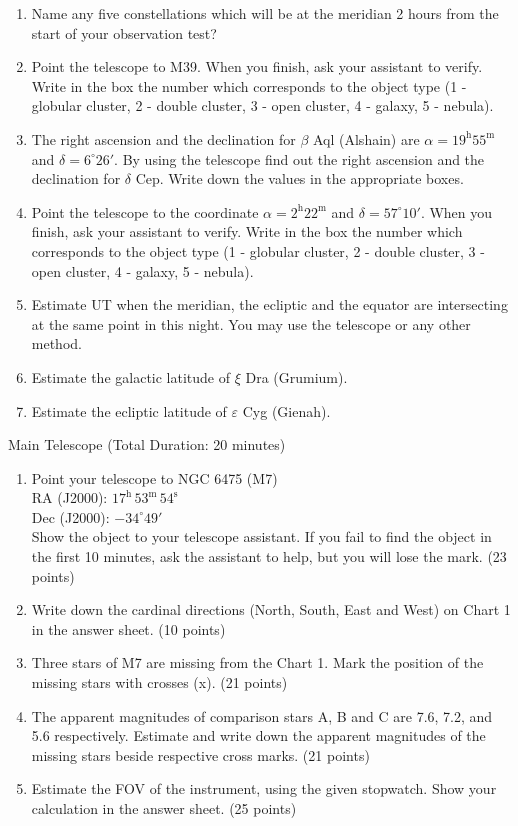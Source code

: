 \begin{enumerate}
\item Name any five constellations which will be at the meridian 2 hours
  from the start of your observation test?
\item Point the telescope to M39. When you finish, ask your assistant to
  verify. Write in the box the number which corresponds to the object type
  (1 - globular cluster, 2 - double cluster, 3 - open cluster, 4 - galaxy,
  5 - nebula).
\item The right ascension and the declination for $\beta$ Aql (Alshain) are
  $\alpha = 19^{\mathrm{h}}55^{\mathrm{m}}$ and $\delta = 6^\circ 26'$. By
  using the telescope find out the right ascension and the declination for
  $\delta$ Cep. Write down the values in the appropriate boxes.
\item Point the telescope to the coordinate
  $\alpha = 2^{\mathrm{h}}22^{\mathrm{m}}$ and $\delta = 57^\circ 10'$. When
  you finish, ask your assistant to verify. Write in the box the number
  which corresponds to the object type (1 - globular cluster, 2 - double
  cluster, 3 - open cluster, 4 - galaxy, 5 - nebula).
\item Estimate UT when the meridian, the ecliptic and the equator are
  intersecting at the same point in this night. You may use the telescope or
  any other method.
\item Estimate the galactic latitude of $\xi$ Dra (Grumium).
\item Estimate the ecliptic latitude of $\varepsilon$ Cyg (Gienah).
\end{enumerate}

Main Telescope (Total Duration: 20 minutes)

\begin{enumerate}
\item Point your telescope to NGC 6475 (M7)\\
  RA (J2000): $17^{\mathrm{h}}\,53^{\mathrm{m}}\,54^{\mathrm{s}}$\\
  Dec (J2000): $-34^\circ 49'$\\
  Show the object to your telescope assistant. If you fail to find the
  object in the first 10 minutes, ask the assistant to help, but you will
  lose the mark. \hfill(23 points)
\item Write down the cardinal directions (North, South, East and West) on
  Chart 1 in the answer sheet. \hfill(10 points)
\item Three stars of M7 are missing from the Chart 1. Mark the position of
  the missing stars with crosses (x). \hfill(21 points)
\item The apparent magnitudes of comparison stars A, B and C are 7.6, 7.2,
  and 5.6 respectively. Estimate and write down the apparent magnitudes of
  the missing stars beside respective cross marks. \hfill(21 points)
\item Estimate the FOV of the instrument, using the given stopwatch. Show
  your calculation in the answer sheet. \hfill(25 points)
\end{enumerate}

